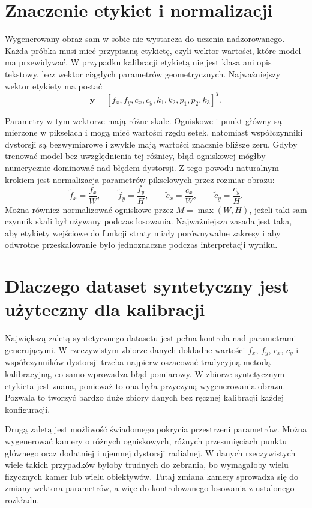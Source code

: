 \documentclass[12pt,a4paper]{report}
\begin{document}
\section{Znaczenie etykiet i normalizacji}
Wygenerowany obraz sam w sobie nie wystarcza do uczenia nadzorowanego. Każda próbka musi mieć
przypisaną etykietę, czyli wektor wartości, które model ma przewidywać. W przypadku kalibracji
etykietą nie jest klasa ani opis tekstowy, lecz wektor ciągłych parametrów geometrycznych.
Najważniejszy wektor etykiety ma postać
\begin{equation}
    \mathbf{y} = [f_x,f_y,c_x,c_y,k_1,k_2,p_1,p_2,k_3]^T.
\end{equation}

Parametry w tym wektorze mają różne skale. Ogniskowe i punkt główny są mierzone w pikselach
i mogą mieć wartości rzędu setek, natomiast współczynniki dystorsji są bezwymiarowe i zwykle
mają wartości znacznie bliższe zeru. Gdyby trenować model bez uwzględnienia tej różnicy, błąd
ogniskowej mógłby numerycznie dominować nad błędem dystorsji. Z tego powodu naturalnym krokiem
jest normalizacja parametrów pikselowych przez rozmiar obrazu:
\begin{equation}
    \tilde{f}_x = \frac{f_x}{W},
    \qquad
    \tilde{f}_y = \frac{f_y}{H},
    \qquad
    \tilde{c}_x = \frac{c_x}{W},
    \qquad
    \tilde{c}_y = \frac{c_y}{H}.
\end{equation}
Można również normalizować ogniskowe przez $M=\max(W,H)$, jeżeli taki sam czynnik skali był
używany podczas losowania. Najważniejsza zasada jest taka, aby etykiety wejściowe do funkcji
straty miały porównywalne zakresy i aby odwrotne przeskalowanie było jednoznaczne podczas
interpretacji wyniku.

\section{Dlaczego dataset syntetyczny jest użyteczny dla kalibracji}
Największą zaletą syntetycznego datasetu jest pełna kontrola nad parametrami generującymi.
W rzeczywistym zbiorze danych dokładne wartości $f_x$, $f_y$, $c_x$, $c_y$ i współczynników
dystorsji trzeba najpierw oszacować tradycyjną metodą kalibracyjną, co samo wprowadza błąd
pomiarowy. W zbiorze syntetycznym etykieta jest znana, ponieważ to ona była przyczyną
wygenerowania obrazu. Pozwala to tworzyć bardzo duże zbiory danych bez ręcznej kalibracji
każdej konfiguracji.

Drugą zaletą jest możliwość świadomego pokrycia przestrzeni parametrów. Można wygenerować
kamery o różnych ogniskowych, różnych przesunięciach punktu głównego oraz dodatniej i ujemnej
dystorsji radialnej. W danych rzeczywistych wiele takich przypadków byłoby trudnych do zebrania,
bo wymagałoby wielu fizycznych kamer lub wielu obiektywów. Tutaj zmiana kamery sprowadza się
do zmiany wektora parametrów, a więc do kontrolowanego losowania z ustalonego rozkładu.
\end{document}
